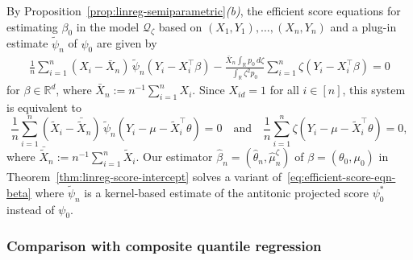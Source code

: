 \documentclass[a4paper]{article}
\newcommand{\R}{\mathbb{R}}
\theoremstyle{definition}
\begin{document}
By Proposition~\ref{prop:linreg-semiparametric}\textit{(b)}, the efficient score equations for estimating $\beta_0$ in the model $\mathcal{Q}_\zeta$ based on $(X_1,Y_1),\dotsc,(X_n,Y_n)$ and a plug-in estimate $\tilde{\psi}_n$ of $\psi_0$ are given by
\begin{align*}
\frac{1}{n}\sum_{i=1}^n (X_i - \bar{X}_n)\,\tilde{\psi}_n(Y_i - X_i^\top\beta) - \frac{\bar{X}_n\int_\R p_0\,d\zeta}{\int_\R \zeta^2 p_0}\sum_{i=1}^n \zeta(Y_i - X_i^\top\beta) = 0
\end{align*}
for $\beta \in \R^d$, where $\bar{X}_n := n^{-1}\sum_{i=1}^n X_i$. Since $X_{id} = 1$ for all $i \in [n]$, this system is equivalent to 
\begin{equation}
\label{eq:efficient-score-eqn-beta}
\frac{1}{n}\sum_{i=1}^n (\tilde{X}_i - \bar{\tilde{X}}_n)\,\tilde{\psi}_n(Y_i - \mu - \tilde{X}_i^\top\theta) = 0 \quad\text{and}\quad \frac{1}{n}\sum_{i=1}^n \zeta(Y_i - \mu - \tilde{X}_i^\top\theta) = 0,
\end{equation}
where $\bar{\tilde{X}}_n := n^{-1}\sum_{i=1}^n \tilde{X}_i$. Our estimator $\hat{\beta}_n = (\hat{\theta}_n,\hat{\mu}_n^\zeta)$ of $\beta = (\theta_0,\mu_0)$ in Theorem~\ref{thm:linreg-score-intercept} solves a variant of~\eqref{eq:efficient-score-eqn-beta} where $\tilde{\psi}_n$ is a kernel-based estimate of the antitonic projected score $\psi_0^*$ instead of $\psi_0$.

\subsubsection{Comparison with composite quantile regression}
\label{subsec:CQR}
\end{document}
